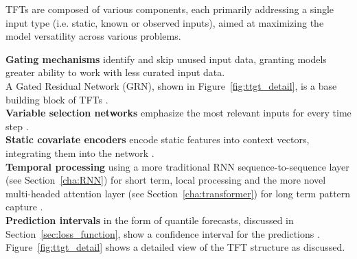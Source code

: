     TFTs are composed of various components, each primarily addressing a single input type (i.e. static, known or observed inputs), aimed at maximizing the model versatility across various problems.
    

    
    \textbf{Gating mechanisms} identify and skip unused input data, granting models greater ability to work with less curated input data.\\
    A Gated Residual Network (GRN), shown in Figure~\ref{fig:ttgt_detail}, is a base building block of TFTs \cite{lim_temporal_2020}.\\
    \indent\textbf{Variable selection networks} emphasize the most relevant inputs for every time step \cite{lim_temporal_2020}.\\
    \indent\textbf{Static covariate encoders} encode static features into context vectors, integrating them into the network \cite{lim_temporal_2020}.  \\
    \indent\textbf{Temporal processing} using a more traditional RNN sequence-to-sequence layer (see Section~\ref{cha:RNN}) for short term, local processing and the more novel multi-headed attention layer (see Section~\ref{cha:transformer}) for long term pattern capture \cite{lim_temporal_2020}.\\
    \indent\textbf{Prediction intervals} in the form of quantile forecasts, discussed in Section~\ref{sec:loss_function}, show a confidence interval for the predictions \cite{lim_temporal_2020}. \\
    Figure~\ref{fig:ttgt_detail} shows a detailed view of the TFT structure as discussed. 
    
